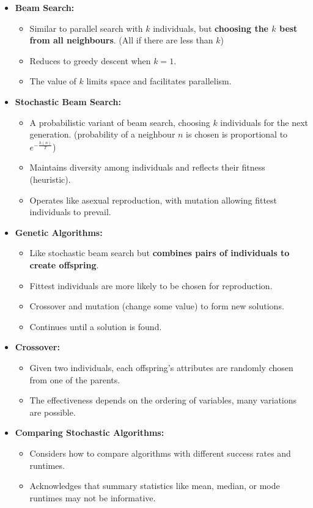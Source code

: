 \documentclass{article}
\theoremstyle{note}
\begin{document}
\begin{itemize}
  \item \textbf{Beam Search:}
  \begin{itemize}
    \item Similar to parallel search with \( k \) individuals, but \textbf{choosing the \( k \) best from all neighbours}.
    \subitem (All if there are less than $k$)
    \item Reduces to greedy descent when \( k = 1 \).
    \item The value of \( k \) limits space and facilitates parallelism.
  \end{itemize}

  \newpage
  \item \textbf{Stochastic Beam Search:}
  \begin{itemize}
    \item A probabilistic variant of beam search, choosing \( k \) individuals for the next generation.
    \subitem (probability of a neighbour $n$ is chosen is proportional to $e^{-\frac{h(n)}{T}}$)
    \item Maintains diversity among individuals and reflects their fitness (heuristic).
    \item Operates like asexual reproduction, with mutation allowing fittest individuals to prevail.
  \end{itemize}

  \item \textbf{Genetic Algorithms:}
  \begin{itemize}
    \item  Like stochastic beam search but \textbf{combines pairs of individuals to create offspring}.
    \item Fittest individuals are more likely to be chosen for reproduction.
    \item Crossover and mutation (change some value) to form new solutions.
    \item Continues until a solution is found.
  \end{itemize}

  \item \textbf{Crossover:}
  \begin{itemize}
    \item Given two individuals, each offspring's attributes are randomly chosen from one of the parents.
    \item The effectiveness depends on the ordering of variables, many variations are possible.
  \end{itemize}

  \item \textbf{Comparing Stochastic Algorithms:}
  \begin{itemize}
    \item Considers how to compare algorithms with different success rates and runtimes.
    \item Acknowledges that summary statistics like mean, median, or mode runtimes may not be informative.
  \end{itemize}


\end{itemize}
\end{document}
